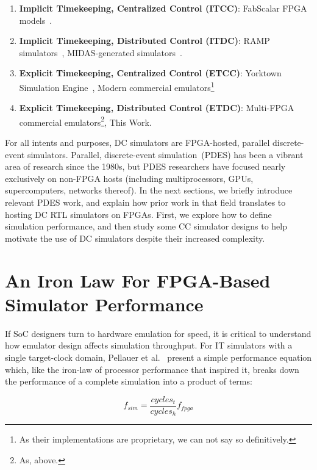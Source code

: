 \begin{enumerate}
\item\textbf{Implicit Timekeeping, Centralized Control (ITCC)}: FabScalar FPGA models~\cite{fabscalarfpga}.

\item\textbf{Implicit Timekeeping, Distributed Control (ITDC)}: RAMP simulators~\cite{RAMPGold, HASim}, MIDAS-generated simulators~\cite{FireSim}.

\item\textbf{Explicit Timekeeping, Centralized Control (ETCC)}: Yorktown Simulation Engine~\cite{YSESoftware}, Modern commercial emulators\footnote{As their implementations are proprietary, we can not say so definitively.}

\item\textbf{Explicit Timekeeping, Distributed Control (ETDC)}: Multi-FPGA commercial emulators\footnote{As, above.}, This Work.
\end{enumerate}

For all intents and purposes, DC simulators are FPGA-hosted, parallel
discrete-event simulators.  Parallel, discrete-event simulation~(PDES) has been
a vibrant area of research since the 1980s, but PDES researchers have focused
nearly exclusively on non-FPGA hosts (including multiprocessors, GPUs,
supercomputers, networks thereof).  In the next sections, we briefly introduce
relevant PDES work, and explain how prior work in that field translates to
hosting DC RTL simulators on FPGAs. First, we explore how to define simulation
performance, and then study some CC simulator designs to help motivate the use
of DC simulators despite their increased complexity.

\section{An Iron Law For FPGA-Based Simulator Performance}\label{sec:iron-law}

If SoC designers turn to hardware emulation for speed, it is critical
to understand how emulator design affects simulation throughput. For IT simulators with a single target-clock domain, Pellauer et al.~\cite{APortNetworks} present a simple performance
equation which, like the iron-law of processor performance that inspired it,
breaks down the performance of a complete simulation into a product of terms:

\begin{equation}
    f_{sim} = \frac{cycles_{t}}{cycles_{h}} f_{fpga}
\end{equation}\label{eq:sim-perf}

